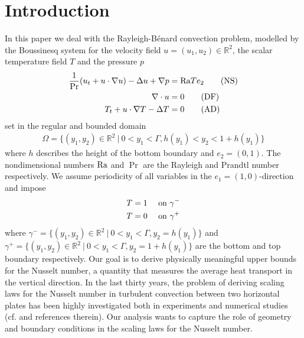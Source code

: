 \documentclass{article}
\theoremstyle{definition}
\theoremstyle{definition}
\newcommand\R{{\mathbb R}}
\newcommand{\Pra}{\rm{Pr}}
\newcommand{\Ra}{{\rm{Ra}}}
\begin{document}
\section{Introduction}
In this paper we deal with the Rayleigh-B\'enard convection problem, modelled by the Boussinesq system for the velocity field $u=(u_1,u_2)\in \R^2$, the scalar temperature field $T$ and the pressure $p$
\begin{align}
    \frac{1}{\Pra}(u_t + u\cdot \nabla u ) -\Delta u +\nabla p &= \Ra T e_2\tag{NS}\label{navierStokes}\\
    \nabla \cdot u &= 0\tag{DF}\label{divergenceFreeIncompressibilityCondition}\\
    T_t +u\cdot \nabla T - \Delta T &= 0\tag{AD}\label{heatEquation}
\end{align}
set in the regular and bounded domain 
\begin{align*}
    \Omega=\{(y_1,y_2) \in \mathbb{R}^2 \ | \ 0 < y_1 < \Gamma, h(y_1) < y_2 < 1+h(y_1)\}
\end{align*}
where $h$ describes the height of the bottom boundary and $e_2=(0,1)$. The nondimensional numbers $\Ra$ and $\Pr$ are the Rayleigh and Prandtl number respectively. 
We assume periodicity of all variables in the $e_1=(1,0)$-direction and impose
 \begin{equation}
    \label{BC-T}
    \begin{aligned}
        T &= 1  & &\textnormal{ on }\gamma^- \\
        T &= 0  & &\textnormal{ on }\gamma^+
    \end{aligned}
\end{equation}
where $\gamma^-=\lbrace (y_1,y_2)\in \mathbb{R}^2\ \vert \ 0<y_1<\Gamma, y_2=h(y_1)\rbrace$ and $\gamma^+=\lbrace (y_1,y_2)\in \mathbb{R}^2\ \vert \ 0<y_1<\Gamma, y_2=1+h(y_1)\rbrace$ are the bottom and top boundary respectively.
Our goal is to derive physically meaningful upper bounds for the Nusselt number, a quantity that measures the average heat transport in the vertical direction.
In the last thirty years, the problem of deriving scaling laws for the Nusselt number in turbulent convection between two horizontal plates has been highly investigated both in experiments and numerical studies (cf.\cite{AGL09} and references therein). 
Our analysis wants to capture the role of geometry and boundary conditions in the scaling laws for the Nusselt number. 
\end{document}
